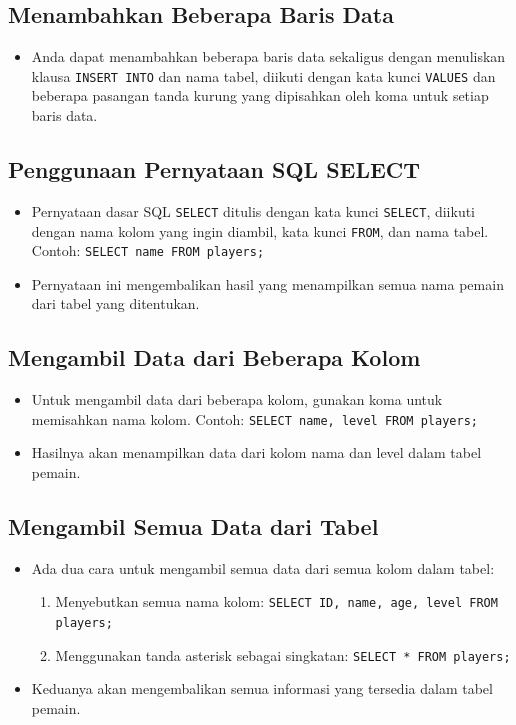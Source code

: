 \documentclass{article}
\begin{document}
\subsection{Menambahkan Beberapa Baris Data}
\begin{itemize}
    \item Anda dapat menambahkan beberapa baris data sekaligus dengan menuliskan klausa \texttt{INSERT INTO} dan nama tabel, diikuti dengan kata kunci \texttt{VALUES} dan beberapa pasangan tanda kurung yang dipisahkan oleh koma untuk setiap baris data.
\end{itemize}

\subsection{Penggunaan Pernyataan SQL SELECT}
\begin{itemize}
    \item Pernyataan dasar SQL \texttt{SELECT} ditulis dengan kata kunci \texttt{SELECT}, diikuti dengan nama kolom yang ingin diambil, kata kunci \texttt{FROM}, dan nama tabel. Contoh: \texttt{SELECT name FROM players;}
    \item Pernyataan ini mengembalikan hasil yang menampilkan semua nama pemain dari tabel yang ditentukan.
\end{itemize}

\subsection{Mengambil Data dari Beberapa Kolom}
\begin{itemize}
    \item Untuk mengambil data dari beberapa kolom, gunakan koma untuk memisahkan nama kolom. Contoh: \texttt{SELECT name, level FROM players;}
    \item Hasilnya akan menampilkan data dari kolom nama dan level dalam tabel pemain.
\end{itemize}

\subsection{Mengambil Semua Data dari Tabel}
\begin{itemize}
    \item Ada dua cara untuk mengambil semua data dari semua kolom dalam tabel:
          \begin{enumerate}
              \item Menyebutkan semua nama kolom: \texttt{SELECT ID, name, age, level FROM players;}
              \item Menggunakan tanda asterisk sebagai singkatan: \texttt{SELECT * FROM players;}
          \end{enumerate}
    \item Keduanya akan mengembalikan semua informasi yang tersedia dalam tabel pemain.
\end{itemize}
\end{document}
